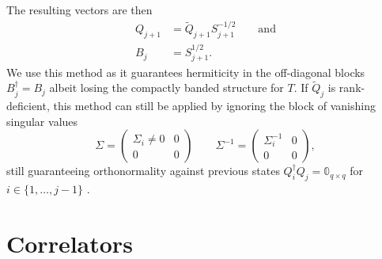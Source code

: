 The resulting vectors are then
\begin{align}
    Q_{j+1} & = \tilde Q_{j+1} S_{j+1}^{-1/2} \qquad \text{and} \\
    B_j     & = S_{j+1}^{1/2}.
\end{align}
We use this method as it guarantees hermiticity in the off-diagonal blocks $B_j^\dag = B_j$
albeit losing the compactly banded structure for $T$.
If $\tilde Q_j$ is rank-deficient,
this method can still be applied \cite{Brass2021} by ignoring the block of vanishing singular values
\begin{equation}
    \Sigma =
    \begin{pmatrix}
        \Sigma_i \neq 0 & 0 \\
        0               & 0
    \end{pmatrix}
    \qquad
    \Sigma^{-1} =
    \begin{pmatrix}
        \Sigma_i^{-1} & 0 \\
        0             & 0
    \end{pmatrix},
\end{equation}
still guaranteeing orthonormality against previous states $Q_i^\dag Q_j = \mathbb{0}_{q\times q}$
for $i \in \{1,\ldots,j-1\}$ \cite{Golub2013}.

\section{Correlators}

